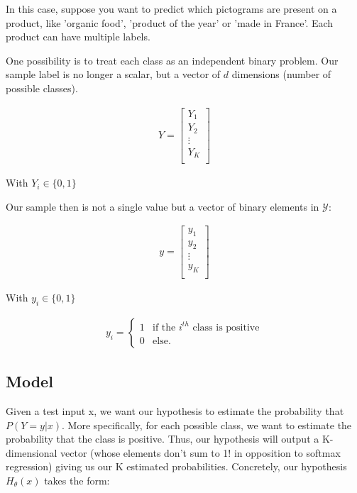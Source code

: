 In this case, suppose you want to predict which pictograms are present on a product, like 'organic food', 'product of the year' or 'made in France'. Each product can have multiple labels.

One possibility is to treat each class as an independent binary problem. Our sample label is no longer a scalar, but a vector of $d$ dimensions (number of possible classes).

\begin{align}
	Y = \left[
	\begin{array}{cccc}
		Y_{1} \\
		Y_{2} \\
		\vdots\\
		Y_{K} \\
	\end{array}\right]
\end{align}

With $Y_{i} \in \{0, 1\}$

Our sample then is not a single value but a vector of binary elements in $\mathcal{Y}$:

\begin{align}
	y = \left[
	\begin{array}{cccc}
		y_{1} \\
		y_{2} \\
		\vdots\\
		y_{K} \\
	\end{array}\right]
\end{align}

With $y_{i} \in \{0, 1\}$

\begin{align}
y_{i} = \left\{
    \begin{array}{ll}
        1 & \mbox{if the } i^{th} \mbox{ class is positive} \\
        0 & \mbox{else.}
    \end{array}
\right.
\end{align}

\subsection{Model}

Given a test input x, we want our hypothesis to estimate the probability that $P(Y=y | x)$. More specifically, for each possible class, we want to estimate the probability that the class is positive. Thus, our hypothesis will output a K-dimensional vector (whose elements don't sum to 1! in opposition to softmax regression) giving us our K estimated probabilities. Concretely, our hypothesis $H_{\theta}(x)$ takes the form:

